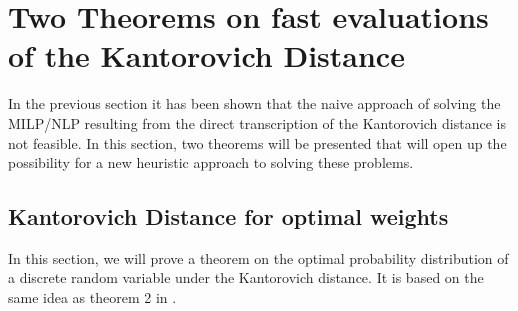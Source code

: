 \section{Two Theorems on fast evaluations of the Kantorovich Distance}
\label{sec:two-theorems}
In the previous section it has been shown that the naive approach of solving the MILP/NLP resulting from the direct transcription of the Kantorovich distance is not feasible.
In this section, two theorems will be presented that will open up the possibility for a new heuristic approach to solving these problems.
\subsection{Kantorovich Distance for optimal weights}
\label{sec:optimal-weights-proof}
In this section, we will prove a theorem on the optimal probability distribution of a discrete random variable under the Kantorovich distance.
It is based on the same idea as theorem 2 in .

